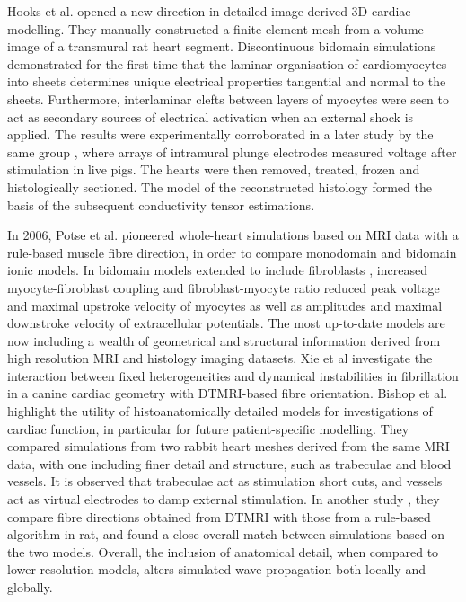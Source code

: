     
  Hooks et al. \cite{Hooks2002} opened a new direction in detailed image-derived 3D cardiac modelling. They manually constructed a finite element mesh from a volume image of a transmural rat heart segment.  Discontinuous bidomain simulations demonstrated for the first time that the laminar organisation of cardiomyocytes into sheets determines unique electrical properties tangential and normal to the sheets. Furthermore, interlaminar clefts between layers of myocytes were seen to act as secondary sources of electrical activation when an external shock is applied. The results were experimentally corroborated in a later study by the same group \cite{Hooks2007}, where arrays of intramural plunge electrodes measured voltage after stimulation in live pigs. The hearts were then removed, treated, frozen and histologically sectioned. The model of the reconstructed histology formed the basis of the subsequent conductivity tensor estimations.
  
  In 2006, Potse et al. \cite{Potse2006} pioneered whole-heart simulations based on MRI data with a rule-based muscle fibre direction, in order to compare monodomain and bidomain ionic models. In bidomain models extended to include fibroblasts \cite{Sachse2009}, increased myocyte-fibroblast coupling and fibroblast-myocyte ratio reduced peak voltage and maximal upstroke velocity of myocytes as well as amplitudes and maximal downstroke velocity of extracellular potentials. The most up-to-date models are now including a wealth of geometrical and structural information derived from high resolution MRI and histology imaging datasets. Xie et al \cite{Xie2004} investigate the interaction between fixed heterogeneities and dynamical instabilities in fibrillation in a canine cardiac geometry with DTMRI-based fibre orientation. Bishop et al. \cite{Bishop2009} highlight the utility of histoanatomically detailed models for investigations of cardiac function, in particular for future patient-specific modelling. They compared simulations from two rabbit heart meshes derived from the same MRI data, with one including finer detail and structure, such as trabeculae and blood vessels. It is observed that trabeculae act as stimulation short cuts, and vessels act as virtual electrodes to damp external stimulation. In another study \cite{Bishop2009a}, they compare fibre directions obtained from DTMRI with those from a rule-based algorithm in rat, and found a close overall match between simulations based on the two models. Overall, the inclusion of anatomical detail, when compared to lower resolution models, alters simulated wave propagation both locally and globally.

